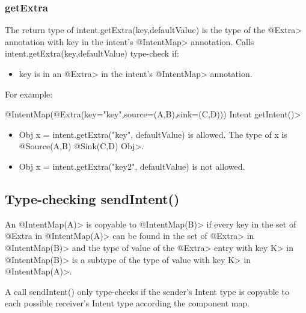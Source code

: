 \subsubsection{getExtra}
The return type of intent.getExtra(key,defaultValue) is the type of the \<@Extra>
annotation with key in the intent's \<@IntentMap> annotation.
Calls intent.getExtra(key,defaultValue) type-check if:
\begin{itemize}
\item
key is in an \<@Extra> in the intent's \<@IntentMap> annotation.
\end{itemize}
For example:
		
\<@IntentMap(@Extra(key="key",source=({A,B}),sink=({C,D})))
		Intent getIntent()>
\begin{itemize}
\item
	Obj x = intent.getExtra("key", defaultValue) is allowed. 
	The type of x is \<@Source(A,B) @Sink(C,D) Obj>. 
\item
	Obj x = intent.getExtra("key2", defaultValue) is not allowed.
\end{itemize}

\subsection{Type-checking sendIntent()}
An \<@IntentMap(A)> is copyable to \<@IntentMap(B)> if every key in the set of
@Extra in \<@IntentMap(A)> can be found in the set of \<@Extra> in
\<@IntentMap(B)> and the type of value of the \<@Extra> entry with key \<K> in
\<@IntentMap(B)> is a subtype of the type of value with key \<K> in
\<@IntentMap(A)>.


A call sendIntent() only type-checks if the sender's Intent type is copyable to
each possible receiver's Intent type according the component map. 


